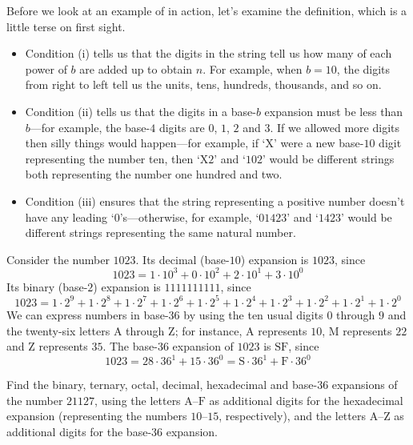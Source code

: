 Before we look at an example of  in action, let's examine the definition, which is a little terse on first sight.
\begin{itemize}
\item Condition (i) tells us that the digits in the string tell us how many of each power of $b$ are added up to obtain $n$. For example, when $b=10$, the digits from right to left tell us the units, tens, hundreds, thousands, and so on.
\item Condition (ii) tells us that the digits in a base-$b$ expansion must be less than $b$---for example, the base-$4$ digits are $0$, $1$, $2$ and $3$. If we allowed more digits then silly things would happen---for example, if `$\mathrm{X}$' were a new base-$10$ digit representing the number ten, then `$\mathrm{X}2$' and `$102$' would be different strings both representing the number one hundred and two.
\item Condition (iii) ensures that the string representing a positive number doesn't have any leading `$0$'s---otherwise, for example, `$01423$' and `$1423$' would be different strings representing the same natural number.
\end{itemize}

\begin{example}
Consider the number $1023$. Its decimal (base-$10$) expansion is $1023$, since
\[ 1023 = 1 \cdot 10^3 + 0 \cdot 10^2 + 2 \cdot 10^1 + 3 \cdot 10^0 \]
Its binary (base-$2$) expansion is $1111111111$, since
\[ 1023 = 1 \cdot 2^9 + 1 \cdot 2^8 + 1 \cdot 2^7 + 1 \cdot 2^6 + 1 \cdot 2^5 + 1 \cdot 2^4 + 1 \cdot 2^3 + 1 \cdot 2^2 + 1 \cdot 2^1 + 1 \cdot 2^0 \]
We can express numbers in base-$36$ by using the ten usual digits $0$ through $9$ and the twenty-six letters $\mathrm{A}$ through $\mathrm{Z}$; for instance, $\mathrm{A}$ represents $10$, $\mathrm{M}$ represents $22$ and $\mathrm{Z}$ represents $35$. The base-$36$ expansion of $1023$ is $\mathrm{SF}$, since
\[ 1023 = 28 \cdot 36^1 + 15 \cdot 36^0 = \mathrm{S} \cdot 36^1 + \mathrm{F} \cdot 36^0 \]
\end{example}

\begin{exercise}
Find the binary, ternary, octal, decimal, hexadecimal and base-$36$ expansions of the number $21127$, using the letters $\mathrm{A}$--$\mathrm{F}$ as additional digits for the hexadecimal expansion (representing the numbers $10$--$15$, respectively), and the letters $\mathrm{A}$--$\mathrm{Z}$ as additional digits for the base-$36$ expansion.
\end{exercise}

